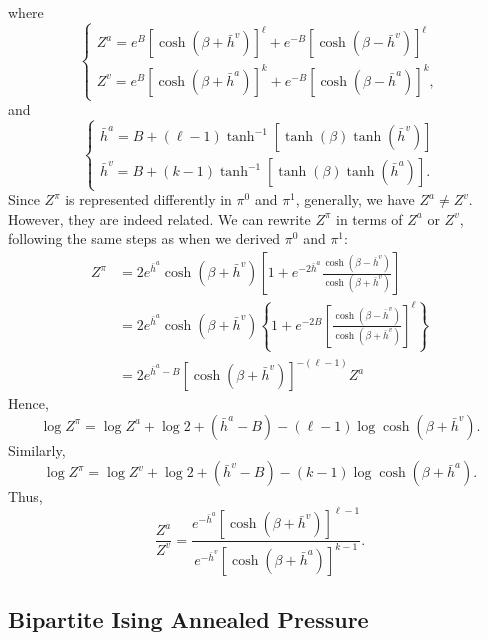 \documentclass[12pt]{article}
\numberwithin{equation}{section}
\begin{document}
where
\begin{equation}
    \begin{cases}
        Z^a = e^{B}[\cosh(\beta + \bar{h}^v)]^\ell + e^{-B}[\cosh(\beta - \bar{h}^v)]^\ell \\
        Z^v = e^{B}[\cosh(\beta + \bar{h}^a)]^k + e^{-B}[\cosh(\beta - \bar{h}^a)]^k,
    \end{cases}
\end{equation}
and
\begin{equation*}
    \begin{cases}
        \bar{h}^a = B + (\ell - 1)\tanh^{-1}[\tanh(\beta)\tanh(\bar{h}^v)] \\
        \bar{h}^v = B + (k - 1)\tanh^{-1}[\tanh(\beta)\tanh(\bar{h}^a)].
    \end{cases}
\end{equation*}
Since $Z^\pi$ is represented differently in $\pi^0$ and $\pi^1$, generally, we have $Z^a \neq Z^v$. However, they are indeed related.
We can rewrite $Z^\pi$ in terms of $Z^a$ or $Z^v$, following the same steps as when we derived $\pi^0$ and $\pi^1$:
\begin{align*}
    Z^\pi & = 2e^{\bar{h}^a} \cosh(\beta + \bar{h}^v)\left[1 + e^{-2\bar{h}^a}\frac{\cosh(\beta - \bar{h}^v)}{\cosh(\beta + \bar{h}^v)}\right]             \\
          & = 2e^{\bar{h}^a} \cosh(\beta + \bar{h}^v)\left\{1 + e^{-2B}\left[\frac{\cosh(\beta - \bar{h}^v)}{\cosh(\beta + \bar{h}^v)}\right]^\ell\right\} \\
          & = 2e^{\bar{h}^a - B}[\cosh(\beta + \bar{h}^v)]^{-(\ell - 1)} Z^a
\end{align*}
Hence,
\begin{equation}
    \log Z^\pi = \log Z^a + \log 2 + (\bar{h}^a - B) - (\ell - 1) \log \cosh(\beta + \bar{h}^v).
    \label{Eq.ISBP-Zpi-Za}
\end{equation}
Similarly,
\begin{equation}
    \log Z^\pi = \log Z^v + \log 2 + (\bar{h}^v - B) - (k - 1) \log \cosh(\beta + \bar{h}^a).
    \label{Eq.ISBP-Zpi-Zv}
\end{equation}
Thus,
\begin{equation}
    \frac{Z^a}{Z^v} = \frac{e^{-\bar{h}^a}[\cosh(\beta + \bar{h}^v)]^{\ell - 1}}{e^{-\bar{h}^v}[\cosh(\beta + \bar{h}^a)]^{k - 1}}.
\end{equation}

\subsection{Bipartite Ising Annealed Pressure}
\end{document}
